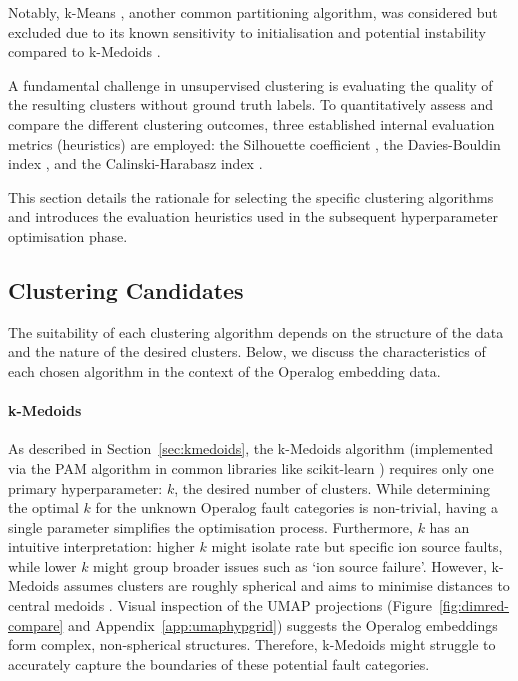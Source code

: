 \documentclass[10pt,oneside]{report}
\begin{document}
Notably, k-Means \cite{macqueen1967some}, another common partitioning algorithm, was considered but excluded due to its known sensitivity to initialisation and potential instability compared to k-Medoids \cite{zhang2008improved}.

A fundamental challenge in unsupervised clustering is evaluating the quality of the resulting clusters without ground truth labels. To quantitatively assess and compare the different clustering outcomes, three established internal evaluation metrics (heuristics) are employed: the Silhouette coefficient \cite{rousseeuw1987silhouettes}, the Davies-Bouldin index \cite{davies1979cluster}, and the Calinski-Harabasz index \cite{calinski1974dendrite}.

This section details the rationale for selecting the specific clustering algorithms and introduces the evaluation heuristics used in the subsequent hyperparameter optimisation phase.

\subsection{Clustering Candidates}

The suitability of each clustering algorithm depends on the structure of the data and the nature of the desired clusters. Below, we discuss the characteristics of each chosen algorithm in the context of the Operalog embedding data.

\paragraph{k-Medoids} As described in Section~\ref{sec:kmedoids}, the k-Medoids algorithm (implemented via the PAM algorithm in common libraries like scikit-learn \cite{scikit-learn}) requires only one primary hyperparameter: $k$, the desired number of clusters. While determining the optimal $k$ for the unknown Operalog fault categories is non-trivial, having a single parameter simplifies the optimisation process. Furthermore, $k$ has an intuitive interpretation:  higher $k$ might isolate rate but specific ion source faults, while lower $k$ might group broader issues such as `ion source failure'. 
However, k-Medoids assumes clusters are roughly spherical and aims to minimise distances to central medoids \cite{kmedoids}. Visual inspection of the UMAP projections (Figure~\ref{fig:dimred-compare} and Appendix~\ref{app:umaphypgrid}) suggests the Operalog embeddings form complex, non-spherical structures. Therefore, k-Medoids might struggle to accurately capture the boundaries of these potential fault categories. 
\end{document}
